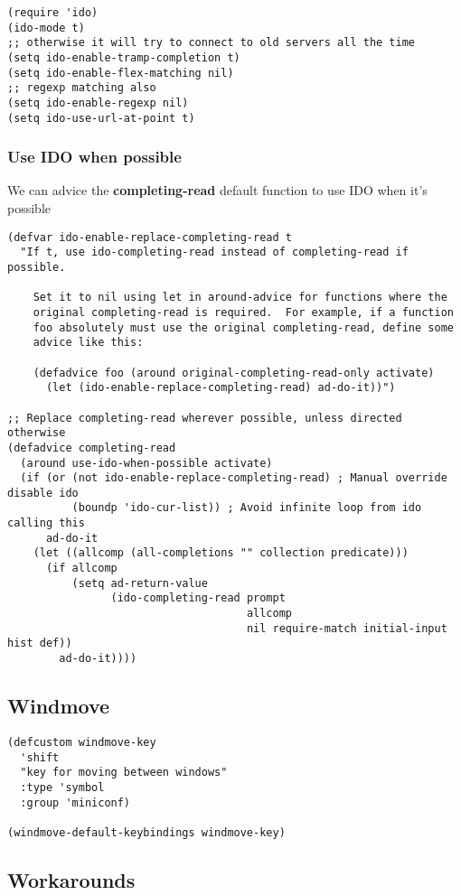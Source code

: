 \documentclass[11pt]{article}
\begin{document}
\begin{verbatim}
(require 'ido)
(ido-mode t)
;; otherwise it will try to connect to old servers all the time
(setq ido-enable-tramp-completion t)
(setq ido-enable-flex-matching nil)
;; regexp matching also
(setq ido-enable-regexp nil)
(setq ido-use-url-at-point t)
\end{verbatim}
\subsubsection{Use IDO when possible}
\label{sec-37.3.1}

    We can advice the \textbf{completing-read} default function to use IDO when it's possible
\begin{verbatim}
(defvar ido-enable-replace-completing-read t
  "If t, use ido-completing-read instead of completing-read if possible.

    Set it to nil using let in around-advice for functions where the
    original completing-read is required.  For example, if a function
    foo absolutely must use the original completing-read, define some
    advice like this:

    (defadvice foo (around original-completing-read-only activate)
      (let (ido-enable-replace-completing-read) ad-do-it))")

;; Replace completing-read wherever possible, unless directed otherwise
(defadvice completing-read
  (around use-ido-when-possible activate)
  (if (or (not ido-enable-replace-completing-read) ; Manual override disable ido
          (boundp 'ido-cur-list)) ; Avoid infinite loop from ido calling this
      ad-do-it
    (let ((allcomp (all-completions "" collection predicate)))
      (if allcomp
          (setq ad-return-value
                (ido-completing-read prompt
                                     allcomp
                                     nil require-match initial-input hist def))
        ad-do-it))))
\end{verbatim}
\subsection{Windmove}
\label{sec-37.4}

\begin{verbatim}
(defcustom windmove-key
  'shift
  "key for moving between windows"
  :type 'symbol
  :group 'miniconf)

(windmove-default-keybindings windmove-key)
\end{verbatim}
\subsection{Workarounds}
\label{sec-37.5}
\end{document}
